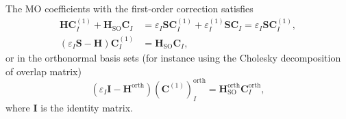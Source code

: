 \documentclass[a4paper,11pt,twoside,openright]{book}
\begin{document}
The MO coefficients with the first-order correction satisfies
\begin{align}
  \mathbf{H}\mathbf{C}^{(1)}_{I}+\mathbf{H}_{\text{SO}}\mathbf{C}_{I}
  &=\varepsilon_{I}\mathbf{S}\mathbf{C}^{(1)}_{I}+\varepsilon_{I}^{(1)}\mathbf{S}\mathbf{C}_{I}
    =\varepsilon_{I}\mathbf{S}\mathbf{C}^{(1)}_{I},\\
  \left(\varepsilon_{I}\mathbf{S}-\mathbf{H}\right)\mathbf{C}^{(1)}_{I}
  &=\mathbf{H}_{\text{SO}}\mathbf{C}_{I},
\end{align}
or in the orthonormal basis sets (for instance using the Cholesky decomposition of overlap matrix)
\begin{equation}
  \left(\varepsilon_{I}\mathbf{I}-\mathbf{H}^{\text{orth}}\right)\left(\mathbf{C}^{(1)}\right)^{\text{orth}}_{I}%
    =\mathbf{H}_{\text{SO}}^{\text{orth}}\mathbf{C}_{I}^{\text{orth}},
\end{equation}
where $\mathbf{I}$ is the identity matrix.
\end{document}
